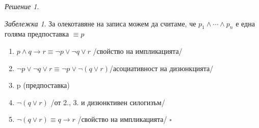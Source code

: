 \documentclass[10pt, a4paper]{article}
\theoremstyle{definition}
\theoremstyle{remark}
\newtheorem*{remark}{Забележка}
\newtheorem*{sol}{Решение}
\begin{document}
\begin{sol}
\begin{remark}
    За олекотавяне на записа можем да считаме, че \(p_1\wedge \cdots\wedge p_n\) е една голяма предпоставка \(\equiv p\)
\end{remark}
\begin{enumerate}
    \item \(p\wedge q\to r \equiv \neg p\vee \neg q\vee r\) /свойство на импликацията/
    \item \(\neg p\vee \neg q\vee r \equiv \neg p\vee \neg (q\vee r)\)/асоциативност на дизюнкцията/
    \item p (предпоставка)
    \item \(\neg (q\vee r)\) /от 2., 3. и дизюнктивен силогизъм/
    \item \(\neg (q\vee r)\equiv q\to r\) /свойство на импликацията/
    \(\square\)
\end{enumerate}
\end{sol}
\end{document}
